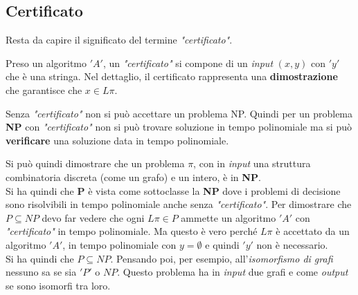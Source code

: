 \subsection{Certificato}
Resta da capire il significato del termine \textit{"certificato"}.
\begin{definizione}
	Preso un algoritmo $ 'A' $, un \textit{"certificato"} si
	compone di un \textit{input} $(x,y)$ con $ 'y' $ che è una stringa. Nel dettaglio, il certificato rappresenta una
	\textbf{dimostrazione} che garantisce che $x\in L\pi$.
\end{definizione}
\begin{nota}
	Senza \textit{"certificato"} non si può accettare un problema NP. Quindi per un problema \textbf{NP} con \textit{"certificato"} non si può trovare
	soluzione in tempo polinomiale ma si può \textbf{verificare} una soluzione data in tempo polinomiale.
\end{nota}
Si può quindi dimostrare che un problema $\pi$, con in \textit{input} una struttura
combinatoria discreta (come un grafo) e un intero, è in \textbf{NP}.\\
Si ha quindi che \textbf{P} è vista come sottoclasse la \textbf{NP} dove i
problemi di decisione sono risolvibili in tempo polinomiale anche senza
\textit{"certificato"}. Per dimostrare che $P\subseteq NP$ devo far vedere che ogni
$L\pi\in P$ ammette un algoritmo $ 'A' $ con \textit{"certificato"} in tempo
polinomiale. Ma questo è vero perché $L\pi$ è accettato da un algoritmo $ 'A' $, in
tempo polinomiale con $y=\emptyset$ e quindi $ 'y' $ non è necessario.\\
Si ha quindi che $P\subseteq NP$. Pensando poi, per esempio,
all'\textit{isomorfismo di grafi} nessuno sa se sia $ 'P' $ o $NP$. Questo
problema ha in \textit{input} due grafi e come \textit{output} se sono isomorfi tra loro.
